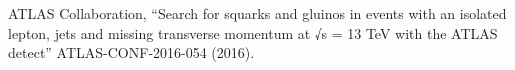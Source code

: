 \documentclass {article}
\begin{document}
\begin{thebibliography}{99}
 ATLAS Collaboration, ``Search for squarks and gluinos in events with an isolated lepton, jets and missing transverse momentum at √s = 13 TeV with the ATLAS detect'' ATLAS-CONF-2016-054 (2016).
\end{thebibliography}
\end{document}
